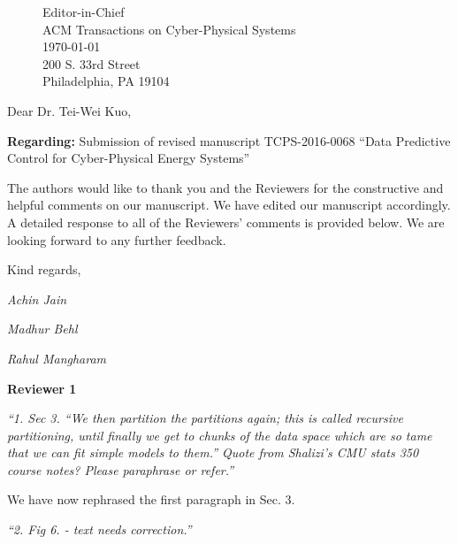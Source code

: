 \documentclass[11pt]{article}
\begin{document}
\vspace*{-1cm}
\begin{figure}
Editor-in-Chief \\ 
ACM Transactions on Cyber-Physical Systems \\
\vspace*{1.5cm}
\flushright \today\\[11pt] %
200 S. 33rd Street  \\ %
Philadelphia, PA 19104
\vspace*{1.0cm}
\end{figure}


\noindent Dear Dr. Tei-Wei Kuo,

\vspace{0.5cm}
\noindent\textbf{Regarding:} Submission of revised manuscript TCPS-2016-0068 ``Data Predictive Control for Cyber-Physical Energy Systems''
\vspace{0.5cm}

\noindent The authors would like to thank you and the Reviewers for the constructive and helpful comments on our manuscript. We have edited our manuscript accordingly. A detailed response to all of the Reviewers' comments is provided below. We are looking forward to any further feedback.
\vspace{0.25cm}

\noindent Kind regards,

\vspace{0.5cm}

\noindent \textit{Achin Jain}

\noindent \textit{Madhur Behl}

\noindent \textit{Rahul Mangharam}

\newpage

\noindent \textbf{Reviewer 1}

\vspace*{0.5cm}
\noindent \emph{``1. Sec 3. 
``We then partition the partitions again; this is called recursive partitioning, until finally we get to chunks of the data space which are so tame that we can fit simple models to them.''
Quote from Shalizi's CMU stats 350 course notes? Please paraphrase or refer.''}

\vspace*{0.25cm}
\color{blue}
\noindent We have now rephrased the first paragraph in Sec. 3.
\color{black}

\vspace*{0.5cm}
\noindent \emph{``2. Fig 6. - text needs correction.''}
\end{document}
